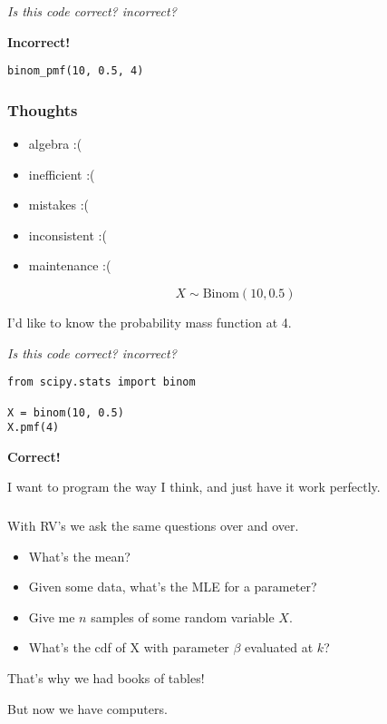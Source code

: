 \documentclass{beamer}
\begin{document}
\begin{frame}[fragile]

\emph{Is this code correct? incorrect?}

\textbf{Incorrect!}

\begin{verbatim}
binom_pmf(10, 0.5, 4)
\end{verbatim}


\end{frame}
\begin{frame}


    \frametitle{Thoughts}

    \begin{itemize}
        \item algebra :(
        \item inefficient :(
        \item mistakes :(
        \item inconsistent :(
        \item maintenance :(
    \end{itemize}

\end{frame}
\begin{frame}[fragile]

\[
        X \sim \text{Binom} (10, 0.5)
\]
    
I'd like to know the probability mass function at 4.

\emph{Is this code correct? incorrect?}

\begin{verbatim}
from scipy.stats import binom

X = binom(10, 0.5)
X.pmf(4)
\end{verbatim}

\textbf{Correct!}

I want to program the way I think, and just have it work perfectly.


\end{frame}
\begin{frame}

    \frametitle{}

    With RV's we ask the same questions over and over.

    \begin{itemize}
        \item What's the mean?
        \item Given some data, what's the MLE for a parameter?
        \item Give me $n$ samples of some random variable $X$.
        \item What's the cdf of X with parameter $\beta$ evaluated at $k$?
    \end{itemize}

    That's why we had books of tables!

    But now we have computers.


\end{frame}
\end{document}
